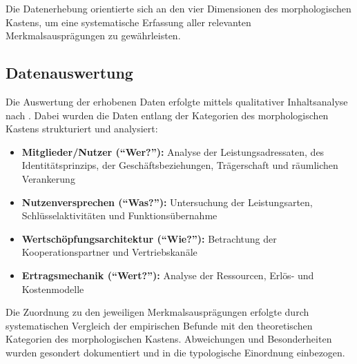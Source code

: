 Die Datenerhebung orientierte sich an den vier Dimensionen des morphologischen Kastens, um eine systematische Erfassung aller relevanten Merkmalsausprägungen zu gewährleisten.

\subsection{Datenauswertung}

Die Auswertung der erhobenen Daten erfolgte mittels qualitativer Inhaltsanalyse nach \textcite{mayringQualitativeInhaltsanalyseGrundlagen2022}. Dabei wurden die Daten entlang der Kategorien des morphologischen Kastens strukturiert und analysiert:

\begin{itemize}
\item \textbf{Mitglieder/Nutzer (\enquote{Wer?}):} Analyse der Leistungsadressaten, des Identitätsprinzips, der Geschäftsbeziehungen, Trägerschaft und räumlichen Verankerung
\item \textbf{Nutzenversprechen (\enquote{Was?}):} Untersuchung der Leistungsarten, Schlüsselaktivitäten und Funktionsübernahme
\item \textbf{Wertschöpfungsarchitektur (\enquote{Wie?}):} Betrachtung der Kooperationspartner und Vertriebskanäle
\item \textbf{Ertragsmechanik (\enquote{Wert?}):} Analyse der Ressourcen, Erlös- und Kostenmodelle
\end{itemize}

Die Zuordnung zu den jeweiligen Merkmalsausprägungen erfolgte durch systematischen Vergleich der empirischen Befunde mit den theoretischen Kategorien des morphologischen Kastens. Abweichungen und Besonderheiten wurden gesondert dokumentiert und in die typologische Einordnung einbezogen.
